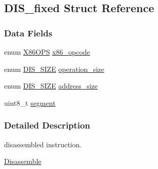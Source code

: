 \hypertarget{struct_d_i_s__fixed}{
\subsection{DIS\_\-fixed Struct Reference}
\label{struct_d_i_s__fixed}
}
\subsubsection*{Data Fields}
\begin{DoxyCompactItemize}
\item 
enum \hyperlink{bytecode__disasm_8h_a6bf8b2b4d6261f0e88170a7d0585a5e2}{X86OPS} \hyperlink{struct_d_i_s__fixed_a372354efff5b025dc9324a03625338a2}{x86\_\-opcode}
\item 
enum \hyperlink{bytecode__disasm_8h_a6a0d419b6b61630b1f76a25ff39df84d}{DIS\_\-SIZE} \hyperlink{struct_d_i_s__fixed_a1a17e54c88513da8e5b1175a785c51ae}{operation\_\-size}
\item 
enum \hyperlink{bytecode__disasm_8h_a6a0d419b6b61630b1f76a25ff39df84d}{DIS\_\-SIZE} \hyperlink{struct_d_i_s__fixed_a772bedb1977f1ae07b9f55991f318bd8}{address\_\-size}
\item 
uint8\_\-t \hyperlink{struct_d_i_s__fixed_afbf231e07d12db4d0ebf0bc223679ae5}{segment}
\end{DoxyCompactItemize}


\subsubsection{Detailed Description}
disassembled instruction. \begin{Desc}
\item[\hyperlink{disasm__disasm000004}{Disassemble}]\end{Desc}



